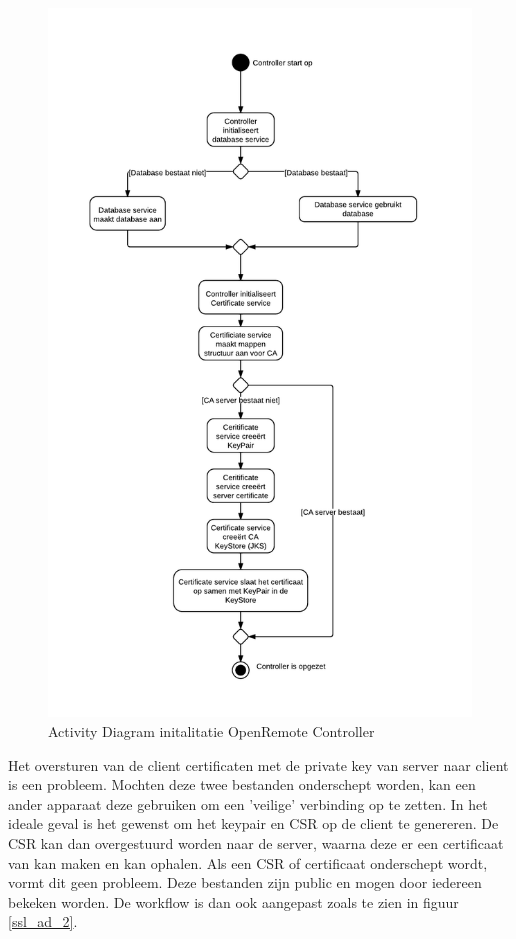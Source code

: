 \documentclass[]{article}
\begin{document}
\begin{figure}[htpb]
   \begin{center}
     \includegraphics[height=0.84\textheight]{OpenremoteControllerAd.pdf}
   \end{center}
   \caption{Activity Diagram initalitatie OpenRemote Controller}
   \label{init_controller}
\end{figure}


Het oversturen van de client certificaten met de private key van server naar
client is een probleem. Mochten deze twee bestanden onderschept worden, kan een
ander apparaat deze gebruiken om een 'veilige' verbinding op te zetten. In het
ideale geval is het gewenst om het keypair en CSR op de client te genereren. De
CSR kan dan overgestuurd worden naar de server, waarna deze er een certificaat
van kan maken en kan ophalen. Als een CSR of certificaat onderschept
wordt, vormt dit geen probleem. Deze bestanden zijn public en mogen door
iedereen bekeken worden. De workflow is dan ook aangepast zoals te zien in
figuur \ref{ssl_ad_2}.
\end{document}
